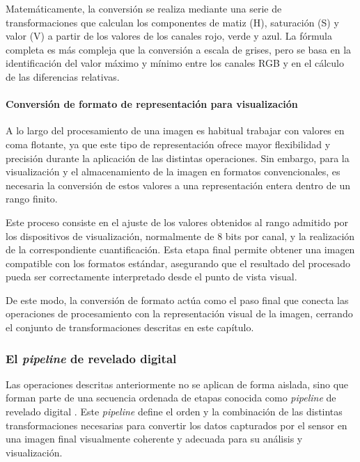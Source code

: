 Matemáticamente, la conversión \cite{rgb_hsv_conversion} se realiza mediante una serie de transformaciones que
calculan los componentes de matiz (H), saturación (S) y valor (V) a partir de los valores
de los canales rojo, verde y azul. La fórmula completa es más compleja que la conversión a escala de grises,
pero se basa en la identificación del valor máximo y mínimo entre los canales RGB y en el cálculo de las diferencias relativas.

\newpage

\paragraph{Conversión de formato de representación para visualización} \label{subsec:3_5_6_3_conversion_formato_representacion_visualizacion}
A lo largo del procesamiento de una imagen es habitual trabajar con valores en coma flotante, ya
que este tipo de representación ofrece mayor flexibilidad y precisión durante la aplicación de
las distintas operaciones. Sin embargo, para la visualización y el almacenamiento de la imagen en formatos
convencionales, es necesaria la conversión de estos valores a una representación entera dentro de un rango
finito.

Este proceso consiste en el ajuste de los valores obtenidos al rango admitido por los dispositivos de
visualización, normalmente de 8 bits por canal, y la realización de la correspondiente cuantificación. Esta
etapa final permite obtener una imagen compatible con los formatos estándar, asegurando que el
resultado del procesado pueda ser correctamente interpretado desde el punto de vista visual.

De este modo, la conversión de formato actúa como el paso final que conecta las operaciones de
procesamiento con la representación visual de la imagen, cerrando el conjunto de transformaciones
descritas en este capítulo.

\newpage

\subsubsection{El \textit{pipeline} de revelado digital} \label{subsec:3_5_7_pipeline_revelado_digital}
Las operaciones descritas anteriormente no se aplican de forma aislada, sino que forman parte de una secuencia 
ordenada de etapas conocida como \textit{pipeline} de revelado digital \cite{image_processing_pipeline}.
Este \textit{pipeline} define el orden y la combinación de las distintas transformaciones necesarias 
para convertir los datos capturados por el sensor en una imagen final visualmente coherente y adecuada 
para su análisis y visualización.

